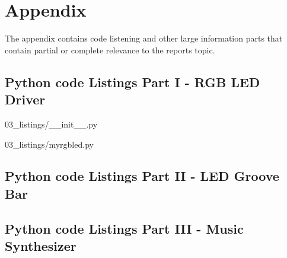 \section{Appendix} \label{sec: Appendix}
The appendix contains code listening and other large information parts that contain partial or complete relevance to the reports topic. 

\subsection{Python code Listings Part I - RGB LED Driver} \label{subsec: Python code Listings Part I}
 {03_listings/__init__.py }

 {03_listings/myrgbled.py }
\subsection{Python code Listings Part II - LED Groove Bar} \label{subsec: Python code Listings Part II}

\subsection{Python code Listings Part III - Music Synthesizer} \label{subsec: Python code Listings Part III}
%
%
%


